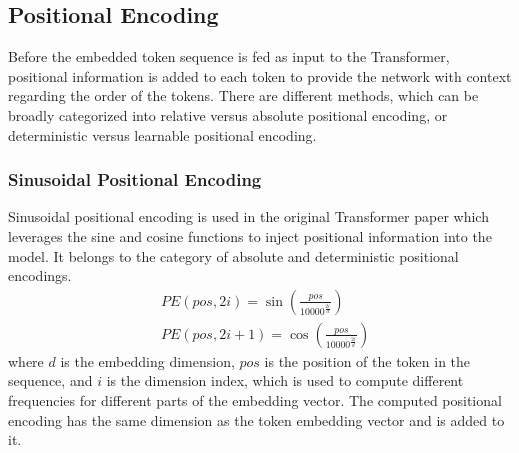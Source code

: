 \subsection{Positional Encoding}
\label{PositionalEmbedding}
Before the embedded token sequence is fed as input to the Transformer, positional information is added to each token to provide the network with context regarding the order of the tokens. There are different methods, which can be broadly categorized into relative \cite{RoPE, ALiBi, FIRE} versus absolute \cite{AttentionIsAllYouNeed, Floater, Cape, Shape} positional encoding, or deterministic \cite{AttentionIsAllYouNeed, Shape, Cape, ALiBi, RoPE} versus learnable \cite{Floater, FIRE} positional encoding. 

\subsubsection{Sinusoidal Positional Encoding}
Sinusoidal positional encoding is used in the original Transformer paper \cite{AttentionIsAllYouNeed} which leverages the sine and cosine functions to inject positional information into the model. It belongs to the category of absolute and deterministic positional encodings.
\begin{align}
    &PE\left( pos, 2i  \right) = \sin \left(  \frac{pos}{10000^{\frac{2i}{d}}} \right) \\
    &PE \left( pos, 2i+1  \right) = \cos \left(  \frac{pos}{10000^{\frac{2i}{d}}} \right)
\end{align}
where $d$ is the embedding dimension, $pos$ is the position of the token in the sequence, and  $i$ is the dimension index, which is used to compute different frequencies for different parts of the embedding vector. The computed positional encoding has the same dimension as the token embedding vector and is added to it.

